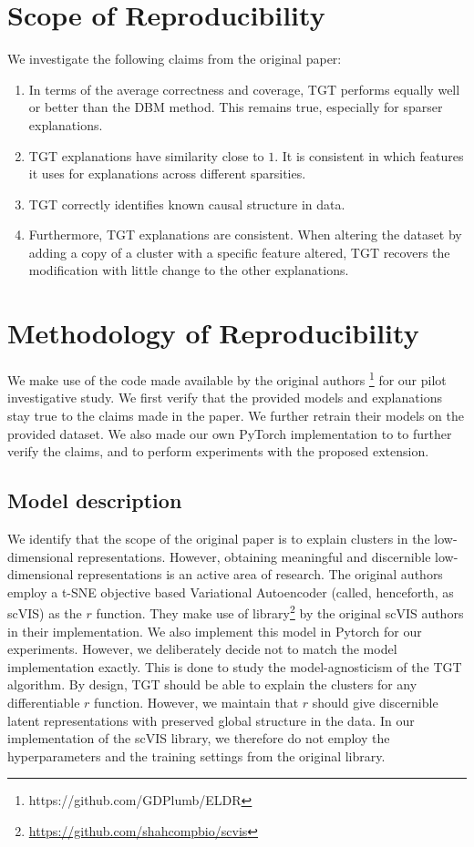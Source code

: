 \section{Scope of Reproducibility}
We investigate the following claims from the original paper:
\begin{enumerate}
    \item In terms of the average correctness and coverage, TGT performs equally well or better than the DBM method. This remains true, especially for sparser explanations.
    \item TGT explanations have similarity close to $1$. It is consistent in which features it uses for explanations across different sparsities.
    \item TGT correctly identifies known causal structure in data.
    \item Furthermore, TGT explanations are consistent. When altering the dataset by adding a copy of a cluster with a specific feature altered, TGT recovers the modification with little change to the other explanations.
\end{enumerate}


\section{Methodology of Reproducibility}

We make use of the code made available by the original authors \footnote{https://github.com/GDPlumb/ELDR} for our pilot investigative study. We first verify that the provided models and explanations stay true to the claims made in the paper. We further retrain their models on the provided dataset. We also made our own PyTorch \cite{paszke2019pytorch} implementation to to further verify the claims, and to perform experiments with the proposed extension.

\subsection{Model description}
We identify that the scope of the original paper is to explain clusters in the low-dimensional representations. However, obtaining meaningful and discernible low-dimensional representations is an active area of research. The original authors employ a t-SNE \cite{van2008visualizing} objective based Variational Autoencoder (called, henceforth, as scVIS) \cite{scvis} as the $r$ function. They make use of library\footnote{ \url{https://github.com/shahcompbio/scvis}} by the original scVIS authors in their implementation. We also implement this model in Pytorch for our experiments. However, we deliberately decide not to match the model implementation exactly. This is done to study the model-agnosticism of the TGT algorithm. By design, TGT should be able to explain the clusters for any differentiable $r$ function. However, we maintain that $r$ should give discernible latent representations with preserved global structure in the data. In our implementation of the scVIS library, we therefore do not employ the hyperparameters and the training settings from the original library. 


